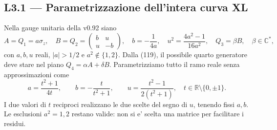 \documentclass[11pt,a4paper]{article}
\begin{document}
\subsection*{L3.1 --- Parametrizzazione dell'intera curva XL}
Nella gauge unitaria della v0.92 siano
\begin{equation}
 A=Q_1=a\sigma_z,\quad B=Q_2=\begin{pmatrix}b&u\\u&-b\end{pmatrix},\quad
 b=-\frac1{4a},\quad u^2=\frac{4a^2-1}{16a^2},\quad Q_3=\beta B,\quad \beta\in\mathbb C^*,
 \tag{L3.1}
\end{equation}
con $a,b,u$ reali, $|a|>1/2$ e $a^2\notin\{1,2\}$. Dalla (119), il possibile quarto generatore deve stare nel piano $Q_4=\alpha A+\delta B$. Parametrizziamo tutto il ramo reale senza approssimazioni come
\begin{equation}
 a=\frac{t^2+1}{4t},\qquad b=-\frac{t}{t^2+1},\qquad
 u=\frac{t^2-1}{2(t^2+1)},\quad t\in\mathbb R\setminus\{0,\pm1\}.
 \tag{L3.2}
\end{equation}
I due valori di $t$ reciproci realizzano le due scelte del segno di $u$, tenendo fissi $a,b$. Le esclusioni $a^2=1,2$ restano valide: non si e' scelta una matrice per facilitare i residui.
\end{document}
